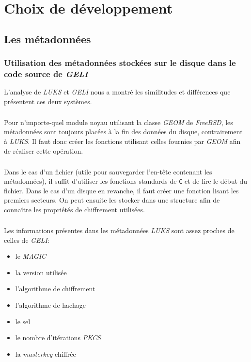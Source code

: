 \chapter{Choix de développement}

\section{Les métadonnées}
\subsection{Utilisation des métadonnées stockées sur le disque dans le code
  source de \textit{GELI}}
\label{ssec:md_usage}
L'analyse de \textit{LUKS} et \textit{GELI} nous a montré les similitudes et
différences que présentent ces deux systèmes.

\paragraph{}
Pour n'importe-quel module noyau utilisant la classe \textit{GEOM} de
\textit{FreeBSD}, les métadonnées sont toujours placées à la fin des données du
disque, contrairement à \textit{LUKS}. Il faut donc créer les fonctions
utilisant celles fournies par \textit{GEOM} afin de réaliser cette opération.
\paragraph{}
Dans le cas d'un fichier (utile pour sauvegarder l'en-tête contenant les 
métadonnées), il suffit d'utiliser les fonctions standards de
\verb|C| et de lire le début du fichier. Dans le cas d'un disque en revanche, il
faut créer une fonction lisant les premiers secteurs. On peut ensuite les
stocker dans une structure afin de connaître les propriétés de chiffrement
utilisées.

\paragraph{}
Les informations présentes dans les métadonnées \textit{LUKS} sont assez proches
de celles de \textit{GELI}:
\begin{itemize}
\item le \textit{MAGIC}
\item la version utilisée
\item l'algorithme de chiffrement
\item l'algorithme de hachage
\item le sel
\item le nombre d'itérations \textit{PKCS}
\item la \textit{masterkey} chiffrée
\end{itemize}

